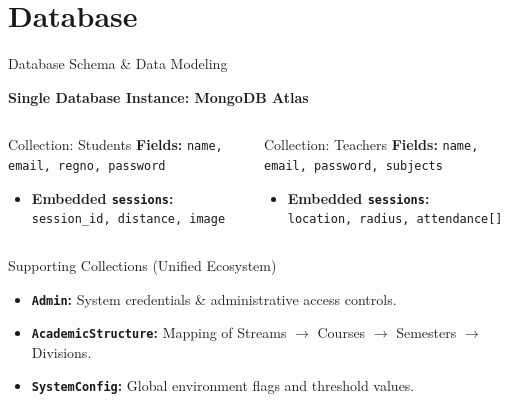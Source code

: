 \documentclass[10pt, aspectratio=169]{beamer}
\begin{document}
\section{Database}
\begin{frame}{Database Schema \& Data Modeling}
    \begin{center}
        \textbf{Single Database Instance: MongoDB Atlas}
    \end{center}
    \vspace{-0.3cm}
    \begin{columns}
        \begin{block}{Collection: Students}
            \scriptsize
            \textbf{Fields:} \texttt{name, email, regno, password}
            \begin{itemize}
                \item \textbf{Embedded \texttt{sessions}:} \\ \texttt{session\_id, distance, image}
            \end{itemize}
        \end{block}
        
        \begin{block}{Collection: Teachers}
            \scriptsize
            \textbf{Fields:} \texttt{name, email, password, subjects}
            \begin{itemize}
                \item \textbf{Embedded \texttt{sessions}:} \\ \texttt{location, radius, attendance[]}
            \end{itemize}
        \end{block}
    \end{columns}
    
    \vspace{0.2cm}
    \begin{block}{Supporting Collections (Unified Ecosystem)}
        \scriptsize
        \begin{itemize}
            \item \textbf{\texttt{Admin}:} System credentials \& administrative access controls.
            \item \textbf{\texttt{AcademicStructure}:} Mapping of Streams $\rightarrow$ Courses $\rightarrow$ Semesters $\rightarrow$ Divisions.
            \item \textbf{\texttt{SystemConfig}:} Global environment flags and threshold values.
        \end{itemize}
    \end{block}
\end{frame}
\end{document}
